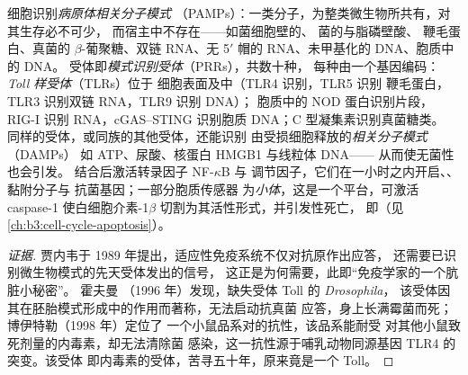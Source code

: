 \begin{definition}[模式识别]\label{def:b3:innate-immunity:prr}
细胞识别\emph{病原体相关分子模式}
（PAMPs）：一类分子，为整类微生物所共有，对其生存必不可少，
而宿主中不存在——如菌细胞壁的、
菌的与脂磷壁酸、
鞭毛蛋白、真菌的 $\beta$-葡聚糖、双链 RNA、无
5$'$ 帽的 RNA、未甲基化的  DNA、胞质中的 DNA。
受体即\emph{模式识别受体}（PRRs），共数十种，
每种由一个基因编码：\emph{Toll 样受体}（TLRs）位于
细胞表面及中（TLR4 识别，TLR5 识别
鞭毛蛋白，TLR3 识别双链 RNA，TLR9 识别  DNA）；
胞质中的 NOD 蛋白识别片段，RIG-I 识别
RNA，cGAS--STING 识别胞质 DNA；C 型凝集素识别真菌糖类。
同样的受体，或同族的其他受体，还能识别
由受损细胞释放的\emph{相关分子模式}（DAMPs）
如 ATP、尿酸、核蛋白 HMGB1 与线粒体 DNA——
从而使无菌性也会引发。
结合后激活转录因子 NF-$\kappa$B 与
调节因子，它们在一小时之内开启、、黏附分子与
抗菌基因；一部分胞质传感器
为\emph{小体}，这是一个平台，可激活 caspase-1
使白细胞介素-1$\beta$ 切割为其活性形式，并引发性死亡，
即（见\cref{ch:b3:cell-cycle-apoptosis}）。
\end{definition}

\begin{proof}[证据]
贾内韦于 1989 年提出，适应性免疫系统不仅对抗原作出应答，
还需要已识别微生物模式的先天受体发出的信号，
这正是为何需要，此即“免疫学家的一个肮脏小秘密”。
霍夫曼
（1996 年）发现，缺失受体 Toll 的 \emph{Drosophila}，
该受体因其在胚胎模式形成中的作用而著称，无法启动抗真菌
应答，身上长满霉菌而死；博伊特勒（1998 年）定位了
一个小鼠品系对的抗性，该品系能耐受
对其他小鼠致死剂量的内毒素，却无法清除菌
感染，这一抗性源于哺乳动物同源基因 TLR4 的突变。该受体
即内毒素的受体，苦寻五十年，原来竟是一个 Toll。
\end{proof}

